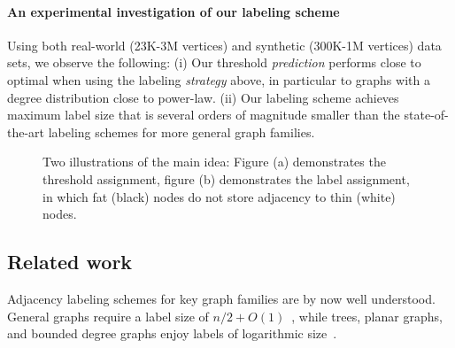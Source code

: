 \vspace{-0.6cm}
\paragraph{An experimental investigation  of our labeling scheme}
Using both real-world (23K-3M vertices) and synthetic (300K-1M vertices) data sets, we observe the following:
(i) Our threshold \emph{prediction} performs close to optimal when using the labeling \emph{strategy} above, in particular to graphs with  a degree distribution  close to  power-law. 
(ii) Our labeling scheme achieves maximum label size that is several orders of magnitude smaller than the state-of-the-art labeling schemes for more general graph families.


\begin{figure}
\centering
{}
\caption{Two illustrations of the main idea: Figure (a) demonstrates the threshold assignment, figure (b) demonstrates the label assignment, in which fat (black) nodes do not store adjacency to thin (white) nodes.}
    \label{f:principle}
\end{figure}

\subsection{Related work}
Adjacency labeling schemes for  key  graph families are by now well understood. 
General graphs  require a label size of $n/2+O(1)$~\cite{moon1965minimal, alstrup2014adjacency}, while 
trees, planar graphs, and bounded degree graphs enjoy labels of logarithmic size~\cite{Alstrup02, gavoille2007shorter, adjiashvili2014labeling}. 

